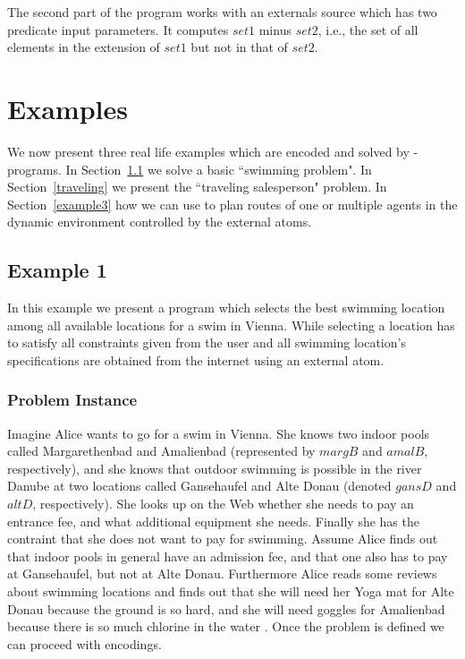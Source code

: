 \documentclass[a4paper, titlepage]{article}
\begin{document}
The second part of the program works with an externals source 
which has two predicate input parameters. It computes $\mathit{set1}$ minus $\mathit{set2}$, i.e., the set of all elements in the extension of $\mathit{set1}$ but not in that of $\mathit{set2}$. 

\section{Examples}
\label{sec:examples}
We now present three real life examples  
which are encoded and solved by \hex-programs. In Section~\ref{example1} we solve a basic ``swimming 
problem". In Section~\ref{traveling} we present the ``traveling salesperson" problem. In Section~\ref{example3} how we can use \dlvhex{} to plan routes of one or multiple agents in the dynamic 
environment controlled by the external atoms.

\subsection{Example 1}
\label{example1}
In this example we present a program which selects  
the best swimming location among all available locations 
for a swim in Vienna. While selecting a location has to 
satisfy all constraints given from the user and all swimming location's specifications are obtained from the internet using  
an external atom.
 
\subsubsection{Problem Instance}
Imagine Alice wants to go for a swim in Vienna. She knows 
two indoor pools called Margarethenbad and Amalienbad 
(represented by $\mathit{margB}$ and $\mathit{amalB}$, 
respectively), and she knows that outdoor swimming is 
possible in the river Danube at two locations called 
Gansehaufel and Alte Donau (denoted $\mathit{gansD}$ and 
$\mathit{altD}$, respectively). She looks up on the Web 
whether she needs to pay an entrance fee, and what 
additional equipment she needs. Finally she has the 
contraint that she does not want to pay for swimming. 
Assume Alice finds out that indoor pools in general have an 
admission fee, and that one also
has to pay at Gansehaufel, but not at Alte Donau. 
Furthermore Alice reads some reviews about swimming 
locations and finds out that she will need her Yoga mat for 
Alte Donau because the ground is so hard, and she will need 
goggles for Amalienbad because there is so much chlorine in 
the water \cite{swim}. Once the problem is defined we can 
proceed with encodings.    
\end{document}
